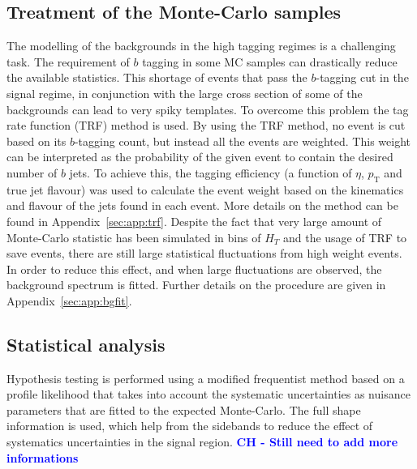 \documentclass[a4paper,11pt]{article}
\newcommand{\CH}[1] {\textbf{\textcolor{blue}{CH - #1}}}
\newcommand{\pt}{\ensuremath{p_{\text{T}}}}
\newcommand*{\hht}{\ensuremath{H_{\ensuremath{T}}}}
\begin{document}
\subsection{Treatment of the Monte-Carlo samples}
\label{subsec:mctreat}
The modelling of the backgrounds in the high tagging regimes is a challenging task. The requirement of $b$ tagging in some MC samples can drastically reduce the available statistics.
This shortage of events that pass the $b$-tagging cut in the signal regime, in conjunction with the large cross section of some of the backgrounds can lead to very spiky templates.
To overcome this problem the tag rate function (TRF) method is used. By using the TRF method, no event is cut based on its $b$-tagging count, but instead all the events are weighted.
This weight can be interpreted as the probability of the given event to contain the desired number of $b$ jets.
To achieve this, the tagging efficiency (a function of $\eta$, $\pt$ and true jet flavour) was
used to calculate the event weight based on the kinematics and flavour of the jets found in each event. More details on the method can be found in Appendix~\ref{sec:app:trf}.
Despite the fact that very large amount of Monte-Carlo statistic has been simulated in bins of $\hht$
and the usage of TRF to save events, there are still large statistical fluctuations from high weight events.
In order to reduce this effect, and when large fluctuations are observed, the background spectrum is fitted. Further details on the procedure are given in Appendix~\ref{sec:app:bgfit}.

\subsection{Statistical analysis}
Hypothesis testing is performed using a modified frequentist method based on a profile likelihood that takes into account the systematic uncertainties as nuisance parameters that are fitted to the expected Monte-Carlo. The full shape information is used, which help from the sidebands to reduce the effect of systematics uncertainties in the signal region.
\CH{Still need to add more informations}

\end{document}
